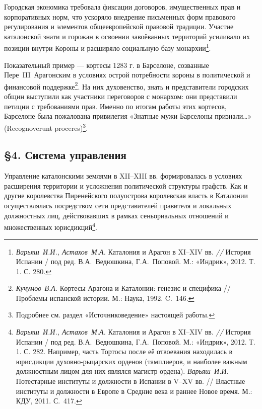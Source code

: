 Городская экономика требовала фиксации договоров, имущественных прав и корпоративных норм, что ускоряло внедрение письменных форм правового регулирования и элементов общеевропейской правовой традиции. Участие каталонской знати и горожан в освоении завоёванных территорий усиливало их позиции внутри Короны и расширяло социальную базу монархии\footnote{\emph{Варьяш}\emph{~И.И., Астахов~М.А.} Каталония и Арагон в XI--XIV вв. \emph{// }История Испании / под ред. В.А.~Ведюшкина, Г.А.~Поповой. М.: «Индрик», 2012. Т. 1. С. 280.}.

Показательный пример --- кортесы 1283 г. в Барселоне, созванные Пере~III~Арагонским в условиях острой потребности короны в политической и финансовой поддержке\footnote{\emph{Кучумов}\emph{~}\emph{В.А. }Кортесы Арагона и Каталонии: генезис и специфика // Проблемы испанской истории. М.: Наука, 1992. C.~146.}. На них духовенство, знать и представители городских общин выступили как участники переговоров с монархом: они представили петиции с требованиями прав. Именно по итогам работы этих кортесов, Барселоне была пожалована привилегия «Знатные мужи Барселоны признали…» (Recognoverunt proceres)\footnote{Подробнее см. раздел «Источниковедение» настоящей работы.}.

\subsection*{§4. Система управления}

Управление каталонскими землями в XII--XIII вв. формировалась в условиях расширения территории и усложнения политической структуры графств. Как и другие королевства Пиренейского полуострова королевская власть в Каталонии осуществлялась посредством сети представителей правителя и локальных должностных лиц, действовавших в рамках сеньориальных отношений и множественных юрисдикций\footnote{\emph{Варьяш}\emph{~И.И., Астахов~М.А.} Каталония и Арагон в XI--XIV вв. \emph{// }История Испании / под ред. В.А.~Ведюшкина, Г.А.~Поповой. М.: «Индрик», 2012. Т. 1. С. 282. Например, часть Тортосы после её отвоевания находилась в юрисдикции духовно-рыцарских орденов (тамплиеров, и наиболее важным должностным лицом для них являлся магистр ордена). \emph{Варьяш}\emph{~}\emph{И.И.} Потестарные институты и должности в Испании в V--XV вв. // Властные институты и должности в Европе в Средние века и раннее Новое время. М.: КДУ, 2011. С.~417.}.

